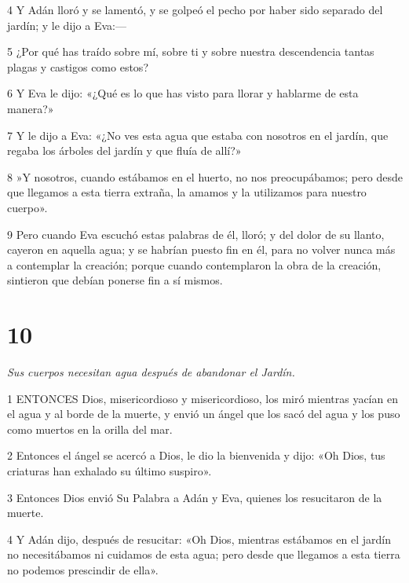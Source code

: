 \par 4 Y Adán lloró y se lamentó, y se golpeó el pecho por haber sido separado del jardín; y le dijo a Eva:—

\par 5 ¿Por qué has traído sobre mí, sobre ti y sobre nuestra descendencia tantas plagas y castigos como estos?

\par 6 Y Eva le dijo: «¿Qué es lo que has visto para llorar y hablarme de esta manera?»

\par 7 Y le dijo a Eva: «¿No ves esta agua que estaba con nosotros en el jardín, que regaba los árboles del jardín y que fluía de allí?»

\par 8 »Y nosotros, cuando estábamos en el huerto, no nos preocupábamos; pero desde que llegamos a esta tierra extraña, la amamos y la utilizamos para nuestro cuerpo».

\par 9 Pero cuando Eva escuchó estas palabras de él, lloró; y del dolor de su llanto, cayeron en aquella agua; y se habrían puesto fin en él, para no volver nunca más a contemplar la creación; porque cuando contemplaron la obra de la creación, sintieron que debían ponerse fin a sí mismos.

\chapter{10}

\par \textit{Sus cuerpos necesitan agua después de abandonar el Jardín.}

\par 1 ENTONCES Dios, misericordioso y misericordioso, los miró mientras yacían en el agua y al borde de la muerte, y envió un ángel que los sacó del agua y los puso como muertos en la orilla del mar.

\par 2 Entonces el ángel se acercó a Dios, le dio la bienvenida y dijo: «Oh Dios, tus criaturas han exhalado su último suspiro».

\par 3 Entonces Dios envió Su Palabra a Adán y Eva, quienes los resucitaron de la muerte.

\par 4 Y Adán dijo, después de resucitar: «Oh Dios, mientras estábamos en el jardín no necesitábamos ni cuidamos de esta agua; pero desde que llegamos a esta tierra no podemos prescindir de ella».


